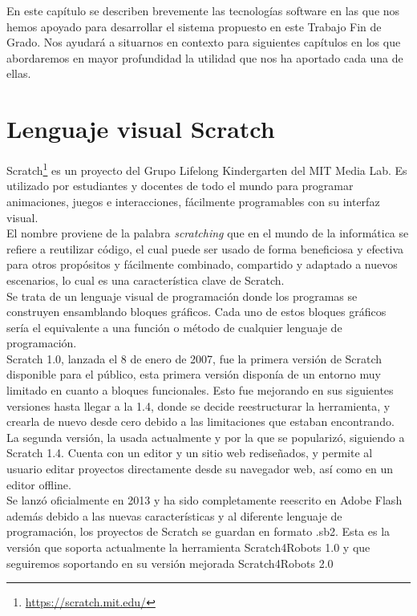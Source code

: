 En este capítulo se describen brevemente las tecnologías
software en las que nos hemos apoyado para desarrollar el sistema propuesto
en este Trabajo Fin de Grado. Nos ayudará a situarnos en contexto para siguientes capítulos en los que abordaremos en mayor profundidad la utilidad que nos ha aportado cada una de ellas.

\section{Lenguaje visual Scratch}
\label{sec:scratch}
Scratch\footnote{\url{https://scratch.mit.edu/}} es un proyecto del Grupo Lifelong Kindergarten del MIT Media Lab.
Es utilizado por estudiantes y docentes de todo el mundo para programar animaciones, juegos e interacciones, fácilmente programables con su interfaz visual.\\

El nombre proviene de la palabra \textit{scratching} que en el mundo de la informática se refiere a reutilizar código, el cual puede ser usado de forma beneficiosa y efectiva para otros propósitos y fácilmente combinado, compartido y adaptado a nuevos escenarios, lo cual es una característica clave de Scratch.\\

Se trata de un lenguaje visual de programación donde los programas se construyen ensamblando bloques gráficos. Cada uno de estos bloques gráficos sería el equivalente a una función o método de cualquier lenguaje de programación.\\

Scratch 1.0, lanzada el 8 de enero de 2007, fue la primera versión de Scratch disponible para el público, esta primera versión disponía de un entorno muy limitado en cuanto a bloques funcionales. Esto fue mejorando en sus siguientes versiones hasta llegar a la 1.4, donde se decide reestructurar la herramienta, y crearla de nuevo desde cero debido a las limitaciones que estaban encontrando.\\

La segunda versión, la usada actualmente y por la que se popularizó, siguiendo a Scratch 1.4. Cuenta con un editor y un sitio web rediseñados, y permite al usuario editar proyectos directamente desde su navegador web, así como en un editor offline.\\

Se lanzó oficialmente en 2013 y ha sido completamente reescrito en Adobe Flash además debido a las nuevas características y al diferente lenguaje de programación, los proyectos de Scratch se guardan en formato .sb2. Esta es la versión que soporta actualmente la herramienta Scratch4Robots 1.0 y que seguiremos soportando en su versión mejorada Scratch4Robots 2.0\\

